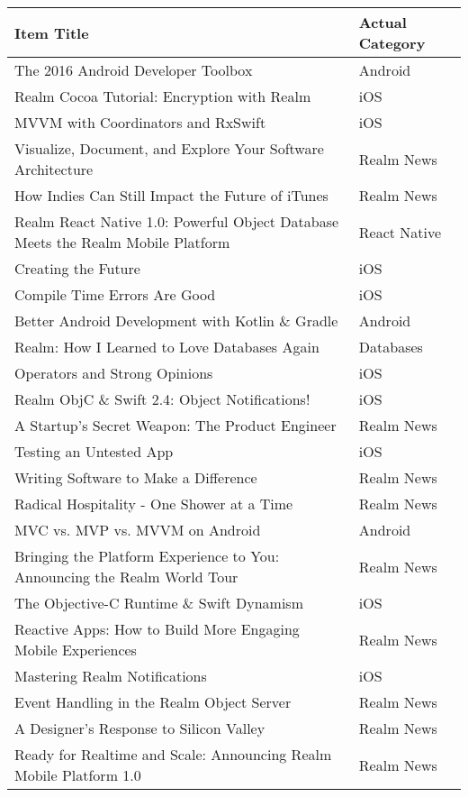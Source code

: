 \documentclass[letterpaper,11pt]{article}
\begin{document}
\begin{table}[h]
\centering
\begin{adjustbox}{max width=\linewidth}
\begin{tabular}{ | l | l |}
\hline
\textbf{Item Title} & \textbf{Actual Category} \\
\hline
%
The 2016 Android Developer Toolbox & Android \\
Realm Cocoa Tutorial: Encryption with Realm & iOS \\
MVVM with Coordinators and RxSwift & iOS \\
Visualize, Document, and Explore Your Software Architecture & Realm News \\
How Indies Can Still Impact the Future of iTunes & Realm News \\
Realm React Native 1.0: Powerful Object Database Meets the Realm Mobile Platform & React Native \\
Creating the Future & iOS \\
Compile Time Errors Are Good & iOS \\
Better Android Development with Kotlin \& Gradle & Android \\
Realm: How I Learned to Love Databases Again & Databases \\
Operators and Strong Opinions & iOS \\
Realm ObjC \& Swift 2.4: Object Notifications! & iOS \\
A Startup’s Secret Weapon: The Product Engineer & Realm News \\
Testing an Untested App & iOS \\
Writing Software to Make a Difference & Realm News \\
Radical Hospitality - One Shower at a Time & Realm News \\
MVC vs. MVP vs. MVVM on Android & Android \\
Bringing the Platform Experience to You: Announcing the Realm World Tour & Realm News \\
The Objective-C Runtime \& Swift Dynamism & iOS \\
Reactive Apps: How to Build More Engaging Mobile Experiences & Realm News \\
Mastering Realm Notifications & iOS \\
Event Handling in the Realm Object Server & Realm News \\
A Designer’s Response to Silicon Valley & Realm News \\
Ready for Realtime and Scale: Announcing Realm Mobile Platform 1.0 & Realm News \\

\end{tabular}
\end{adjustbox}
\end{table}
\end{document}
